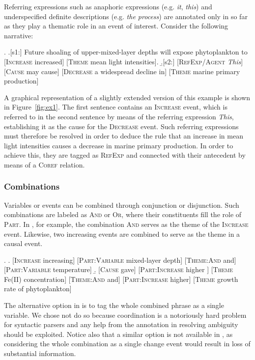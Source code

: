 \documentclass[10pt, a4paper]{article}
\newcommand{\tag}[1]{\textsc{#1}}
\begin{document}
Referring expressions such as anaphoric expressions (e.g. \emph{it}, \emph{this}) and underspecified definite descriptions (e.g. \emph{the process}) are annotated only in so far as they play a thematic role in an event of interest. Consider the following narrative:
\pagebreak[4]

\exi. 
  \a.[s1:] Future shoaling of upper-mixed-layer depths will expose phytoplankton to [\tag{Increase} increased] [\tag{Theme} mean light intensities].
  \b.[s2:] [\tag{RefExp/Agent} \emph{This}] [\tag{Cause} may cause] [\tag{Decrease} a widespread decline in] [\tag{Theme} marine primary production]

A graphical representation of a slightly extended version of this example is shown in Figure~\ref{fig:ex1}.
The first sentence contains an \tag{Increase} event, which is referred to in the second sentence by means of the referring expression \emph{This}, establishing it as the cause for the \tag{Decrease} event.
Such referring expressions must therefore be resolved in order to deduce the rule that an increase in mean light intensities causes a decrease in marine primary production.
In order to achieve this, they are tagged as \tag{RefExp} and connected with their antecedent by means of a \tag{Coref} relation. 
  

\subsubsection{Combinations}

Variables or events can be combined through conjunction or disjunction.
Such combinations are labeled as \tag{And} or \tag{Or}, where their constituents fill the role of \tag{Part}.
In \Next[a], for example, the combination \tag{And} serves as the theme of the \tag{Increase} event.
Likewise, two increasing events are combined to serve as the theme in a causal event.

\exi.
  \a. [\tag{Increase} increasing] [\tag{Part:Variable} mixed-layer depth] [\tag{Theme:And} and] [\tag{Part:Variable} temperature]  
  \b. [\tag{Cause} gave] [\tag{Part:Increase} higher ] [\tag{Theme} Fe(II) concentration] [\tag{Theme:And} and] [\tag{Part:Increase} higher] [\tag{Theme} growth rate of phytoplankton]

The alternative option in \Last[a] is to tag the whole combined phrase as a single variable.
We chose not do so because coordination is a notoriously hard problem for syntactic parsers and any help from the annotation in resolving ambiguity should be exploited.
Notice also that a similar option is not available in \Last[b], as considering the whole combination as a single change event would result in loss of substantial information.
\end{document}
